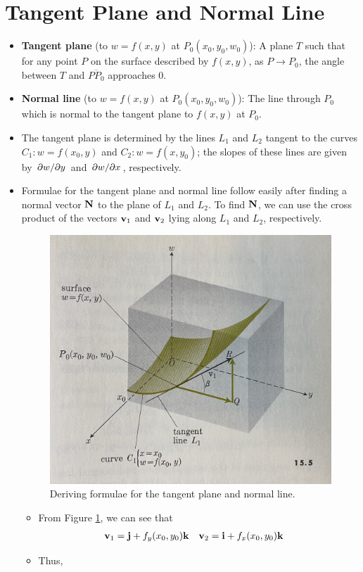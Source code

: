 \documentclass[../main.tex]{subfiles}
\begin{document}
\section{Tangent Plane and Normal Line}
\begin{itemize}
    \item \textbf{Tangent plane} (to $w=f(x,y)$ at $P_0(x_0,y_0,w_0)$): A plane $T$ such that for any point $P$ on the surface described by $f(x,y)$, as $P\to P_0$, the angle between $T$ and $\overline{PP_0}$ approaches 0.
    \item \textbf{Normal line} (to $w=f(x,y)$ at $P_0(x_0,y_0,w_0)$): The line through $P_0$ which is normal to the tangent plane to $f(x,y)$ at $P_0$.
    \item The tangent plane is determined by the lines $L_1$ and $L_2$ tangent to the curves $C_1:w=f(x_0,y)$ and $C_2:w=f(x,y_0)$; the slopes of these lines are given by $\pdv*{w}{y}$ and $\pdv*{w}{x}$, respectively.
    \item Formulae for the tangent plane and normal line follow easily after finding a normal vector $\vb{N}$ to the plane of $L_1$ and $L_2$. To find $\vb{N}$, we can use the cross product of the vectors $\vb{v}_1$ and $\vb{v}_2$ lying along $L_1$ and $L_2$, respectively.
    \begin{figure}[h!]
        \centering
        \includegraphics[width=0.4\linewidth]{ExtFiles/deriveTangentPlane.jpg}
        \caption{Deriving formulae for the tangent plane and normal line.}
        \label{fig:deriveTangentPlane}
    \end{figure}
    \begin{itemize}
        \item From Figure \ref{fig:deriveTangentPlane}, we can see that
        \begin{align*}
            \vb{v}_1 &= \vb{j}+f_y(x_0,y_0)\vb{k}&
                \vb{v}_2 &= \vb{i}+f_x(x_0,y_0)\vb{k}
        \end{align*}
        \item Thus,
        \begin{equation*}

\end{equation*}
\end{itemize}
\end{itemize}
\end{document}
